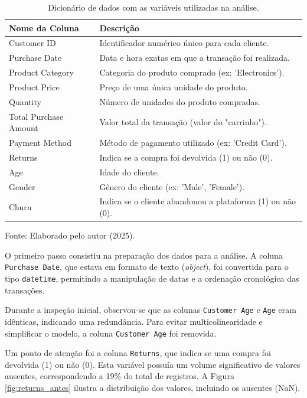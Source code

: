 \begin{table}[h!]
\centering
\caption{Dicionário de dados com as variáveis utilizadas na análise.}
\label{tab:dicionario_dados}
\begin{tabular}{ll}
\toprule
\textbf{Nome da Coluna} & \textbf{Descrição} \\
\midrule
Customer ID & Identificador numérico único para cada cliente. \\
Purchase Date & Data e hora exatas em que a transação foi realizada. \\
Product Category & Categoria do produto comprado (ex: 'Electronics'). \\
Product Price & Preço de uma única unidade do produto. \\
Quantity & Número de unidades do produto compradas. \\
Total Purchase Amount & Valor total da transação (valor do "carrinho"). \\
Payment Method & Método de pagamento utilizado (ex: 'Credit Card'). \\
Returns & Indica se a compra foi devolvida (1) ou não (0). \\
Age & Idade do cliente. \\
Gender & Gênero do cliente (ex: 'Male', 'Female'). \\
Churn & Indica se o cliente abandonou a plataforma (1) ou não (0). \\
\bottomrule
\end{tabular}
\end{table}
\begin{flushleft}
\footnotesize Fonte: Elaborado pelo autor (2025).
\end{flushleft}

O primeiro passo consistiu na preparação dos dados para a análise. A coluna \texttt{Purchase Date}, que estava em formato de texto (\textit{object}), foi convertida para o tipo \texttt{datetime}, permitindo a manipulação de datas e a ordenação cronológica das transações.

Durante a inspeção inicial, observou-se que as colunas \texttt{Customer Age} e \texttt{Age} eram idênticas, indicando uma redundância. Para evitar multicolinearidade e simplificar o modelo, a coluna \texttt{Customer Age} foi removida.

Um ponto de atenção foi a coluna \texttt{Returns}, que indica se uma compra foi devolvida (1) ou não (0). Esta variável possuía um volume significativo de valores ausentes, correspondendo a 19\% do total de registros. A Figura \ref{fig:returns_antes} ilustra a distribuição dos valores, incluindo os ausentes (NaN).

